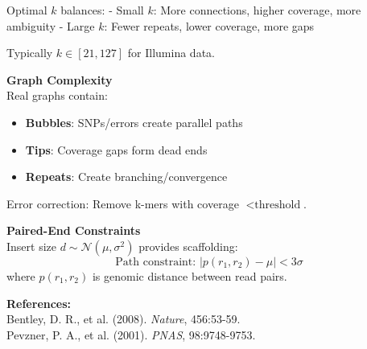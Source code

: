 \begin{technical}
Optimal $k$ balances:
- Small $k$: More connections, higher coverage, more ambiguity
- Large $k$: Fewer repeats, lower coverage, more gaps

Typically $k \in [21, 127]$ for Illumina data.

\textbf{Graph Complexity}\\[0.5em]
Real graphs contain:
\begin{itemize}[leftmargin=*, topsep=0pt, itemsep=0pt]
\item \textbf{Bubbles}: SNPs/errors create parallel paths
\item \textbf{Tips}: Coverage gaps form dead ends
\item \textbf{Repeats}: Create branching/convergence
\end{itemize}

Error correction: Remove k-mers with coverage $< \text{threshold}$.

\textbf{Paired-End Constraints}\\[0.5em]
Insert size $d \sim \mathcal{N}(\mu, \sigma^2)$ provides scaffolding:
\[
\text{Path constraint: } |p(r_1, r_2) - \mu| < 3\sigma
\]
where $p(r_1, r_2)$ is genomic distance between read pairs.

\vspace{0.5em}
\textbf{References:}\\
Bentley, D. R., et al. (2008). \textit{Nature}, 456:53-59.\\
Pevzner, P. A., et al. (2001). \textit{PNAS}, 98:9748-9753.
\end{technical}